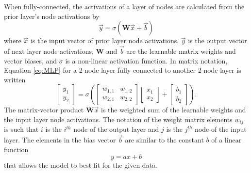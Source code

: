 When fully-connected, the activations of a layer of nodes are calculated from the prior layer's node activations by
\begin{equation} \label{eq:MLP}
	\vec{y} = \sigma \left(\textbf{W}\vec{x} + \vec{b}\right)
\end{equation}
where $\vec{x}$ is the input vector of prior layer node activations, $\vec{y}$ is the output vector of next layer node activations, $\textbf{W}$ and $\vec{b}$ are the learnable matrix weights and vector biases, and $\sigma$ is a non-linear activation function. In matrix notation, Equation \ref{eq:MLP} for a 2-node layer fully-connected to another 2-node layer is written
\begin{equation} \label{eq:MLP_matrix}
	\begin{bmatrix}
		y_{1} \\
		y_{2}
	\end{bmatrix}
	= \sigma \left(
	\begin{bmatrix}
		w_{1,1} & w_{1,2} \\
		w_{2,1} & w_{2,2}
	\end{bmatrix}
	\begin{bmatrix}
		x_{1} \\
		x_{2}
	\end{bmatrix}
	+
	\begin{bmatrix}
		b_{1} \\
		b_{2}
	\end{bmatrix}
	\right).
\end{equation}
The matrix-vector product $\textbf{W}\vec{x}$ is the weighted sum of the learnable weights and the input layer node activations. The notation of the weight matrix elements $w_{ij}$ is such that $i$ is the $i^{th}$ node of the output layer and $j$ is the $j^{th}$ node of the input layer. The elements in the bias vector $\vec{b}$ are similar to the constant $b$ of a linear function
\[
y = ax + b
\]
that allows the model to best fit for the given data.

